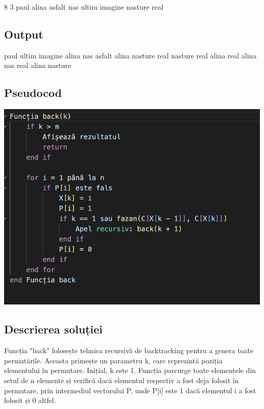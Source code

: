 \documentclass[runningheads]{llncs}
\begin{document}
8 3 \newline
paul alina asfalt nas ultim imagine nasture real 

\subsection{Output}

\begin{center}
paul ultim imagine\newline
alina nas asfalt \newline
alina nasture real \newline
nasture real alina \newline
real alina nas \newline
real alina nasture \newline
\end{center}
\subsection{Pseudocod}

\begin{center}
    \includegraphics[scale=0.6]{p3.png}
\end{center}


\subsection{Descrierea soluției}

Funcția "back" folosește tehnica recursivă de backtracking pentru a genera toate permutările. Aceasta primește un parametru k, care reprezintă poziția elementului în permutare. Inițial, k este 1. Funcția parcurge toate elementele din setul de n elemente și verifică dacă elementul respectiv a fost deja folosit în permutare, prin intermediul vectorului P, unde P[i] este 1 dacă elementul i a fost folosit și 0 altfel. \newline
\end{document}
